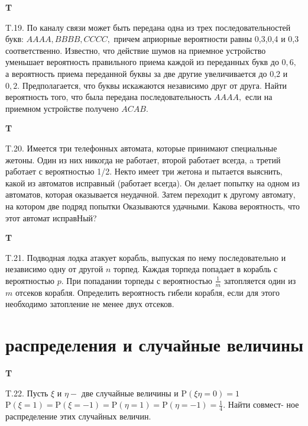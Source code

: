 \documentclass[a4paper,12pt]{article} %
\begin{document}
\begin{example}\textbf{T}

T.19. По каналу связи может быть передана одна из трех последовательностей букв: $A A A A, B B B B, C C C C,$ причем априорные вероятности равны 0,3,0,4 и 0,3 соответственно. Известно, что действие шумов на приемное устройство уменьшает вероятность правильного приема каждой из переданных букв до $0,6,$ а вероятность приема переданной буквы за две другие увеличивается до 0,2 и $0,2 .$ Предполагается, что буквы искажаются независимо друг от друга. Найти вероятность того, что была передана последовательность $A A A A,$ если на приемном устройстве получено $A C A B$.



\end{example}


\begin{example}\textbf{T}

T.20. Имеется три телефонных автомата, которые принимают специальные жетоны. Один из них никогда не работает, второй работает всегда, a третий работает с вероятностью 1/2. Некто имеет три жетона и пытается выяснить, какой из автоматов исправный (работает всегда). Он
делает попытку на одном из автоматов, которая оказывается неудачной.
Затем переходит к другому автомату, на котором две подряд попытки
Оказываются удачными. Какова вероятность, что этот автомат исправНый?


\end{example}





\begin{example}\textbf{T}

T.21. Подводная лодка атакует корабль, выпуская по нему последовательно и независимо одну от другой $n$ торпед. Каждая торпеда попадает в корабль с вероятностью $p .$ При попадании торпеды с вероятностью $\frac{1}{m}$ затопляется один из $m$ отсеков корабля. Определить вероятность гибели корабля, если для этого необходимо затопление не менее двух отсеков.


\end{example}


\section{распределения и случайные величины}


\begin{example}\textbf{T}

T.22. Пусть $\xi$ и $\eta-$ две случайные величины и $\mathrm{P}(\xi \eta=0)=1$ $\mathrm{P}(\xi=1)=\mathrm{P}(\xi=-1)=\mathrm{P}(\eta=1)=\mathrm{P}(\eta=-1)=\frac{1}{4} .$ Найти совмест-
ное распределение этих случайных величин.


\end{example}
\end{document}
